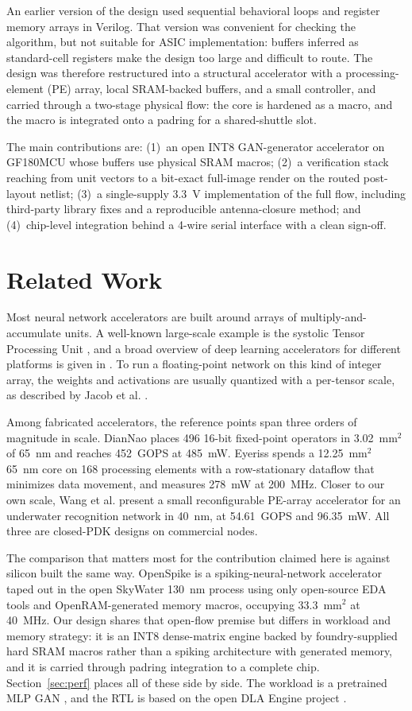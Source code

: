 \documentclass[conference,a4paper]{APSIPA2026}
\begin{document}
An earlier version of the design used sequential behavioral loops and register memory arrays in Verilog. That version was convenient for checking the algorithm, but not suitable for ASIC implementation: buffers inferred as standard-cell registers make the design too large and difficult to route. The design was therefore restructured into a structural accelerator with a processing-element (PE) array, local SRAM-backed buffers, and a small controller, and carried through a two-stage physical flow: the core is hardened as a macro, and the macro is integrated onto a padring for a shared-shuttle slot.

The main contributions are: (1)~an open INT8 GAN-generator accelerator on GF180MCU whose buffers use physical SRAM macros; (2)~a verification stack reaching from unit vectors to a bit-exact full-image render on the routed post-layout netlist; (3)~a single-supply 3.3~V implementation of the full flow, including third-party library fixes and a reproducible antenna-closure method; and (4)~chip-level integration behind a 4-wire serial interface with a clean sign-off.

\section{Related Work}
Most neural network accelerators are built around arrays of multiply-and-accumulate units. A well-known large-scale example is the systolic Tensor Processing Unit \cite{tpu}, and a broad overview of deep learning accelerators for different platforms is given in \cite{survey}. To run a floating-point network on this kind of integer array, the weights and activations are usually quantized with a per-tensor scale, as described by Jacob et al. \cite{jacob}.

Among fabricated accelerators, the reference points span three orders of magnitude in scale. DianNao \cite{diannao} places 496 16-bit fixed-point operators in 3.02~mm$^2$ of 65~nm and reaches 452~GOPS at 485~mW. Eyeriss \cite{eyeriss} spends a 12.25~mm$^2$ 65~nm core on 168 processing elements with a row-stationary dataflow that minimizes data movement, and measures 278~mW at 200~MHz. Closer to our own scale, Wang et al. \cite{wang} present a small reconfigurable PE-array accelerator for an underwater recognition network in 40~nm, at 54.61~GOPS and 96.35~mW. All three are closed-PDK designs on commercial nodes.

The comparison that matters most for the contribution claimed here is against silicon built the same way. OpenSpike \cite{openspike} is a spiking-neural-network accelerator taped out in the open SkyWater 130~nm process using only open-source EDA tools and OpenRAM-generated memory macros, occupying 33.3~mm$^2$ at 40~MHz. Our design shares that open-flow premise but differs in workload and memory strategy: it is an INT8 dense-matrix engine backed by foundry-supplied hard SRAM macros rather than a spiking architecture with generated memory, and it is carried through padring integration to a complete chip. Section~\ref{sec:perf} places all of these side by side. The workload is a pretrained MLP GAN \cite{goodfellow, ganpretrained}, and the RTL is based on the open DLA Engine project \cite{dlaengine}.
\end{document}
